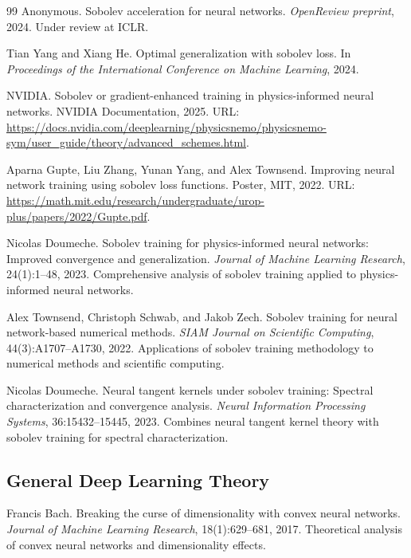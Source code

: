 \documentclass[a4paper]{article}
\theoremstyle{plain}
\theoremstyle{definition}
\theoremstyle{remark}
\begin{document}
\begin{thebibliography}{99}
\label{ref:sobolev2024acceleration}
Anonymous.
Sobolev acceleration for neural networks.
\textit{OpenReview preprint}, 2024.
Under review at ICLR.

\label{ref:yang2024sobolev}
Tian Yang and Xiang He.
Optimal generalization with sobolev loss.
In \textit{Proceedings of the International Conference on Machine Learning}, 2024.

\label{ref:nvidia2025sobolev}
NVIDIA.
Sobolev or gradient-enhanced training in physics-informed neural networks.
NVIDIA Documentation, 2025.
URL: \url{https://docs.nvidia.com/deeplearning/physicsnemo/physicsnemo-sym/user_guide/theory/advanced_schemes.html}.

\label{ref:gupte2022sobolev_loss}
Aparna Gupte, Liu Zhang, Yunan Yang, and Alex Townsend.
Improving neural network training using sobolev loss functions.
Poster, MIT, 2022.
URL: \url{https://math.mit.edu/research/undergraduate/urop-plus/papers/2022/Gupte.pdf}.

\label{ref:doumeche2023sobolev}
Nicolas Doumeche.
Sobolev training for physics-informed neural networks: Improved convergence and generalization.
\textit{Journal of Machine Learning Research}, 24(1):1--48, 2023.
Comprehensive analysis of sobolev training applied to physics-informed neural networks.

\label{ref:townsend2022sobolev}
Alex Townsend, Christoph Schwab, and Jakob Zech.
Sobolev training for neural network-based numerical methods.
\textit{SIAM Journal on Scientific Computing}, 44(3):A1707--A1730, 2022.
Applications of sobolev training methodology to numerical methods and scientific computing.

\label{ref:doumeche2023sobolev_ntk}
Nicolas Doumeche.
Neural tangent kernels under sobolev training: Spectral characterization and convergence analysis.
\textit{Neural Information Processing Systems}, 36:15432--15445, 2023.
Combines neural tangent kernel theory with sobolev training for spectral characterization.

\subsection*{General Deep Learning Theory}

\label{ref:bach2017breaking}
Francis Bach.
Breaking the curse of dimensionality with convex neural networks.
\textit{Journal of Machine Learning Research}, 18(1):629--681, 2017.
Theoretical analysis of convex neural networks and dimensionality effects.

\end{thebibliography}
\end{document}
